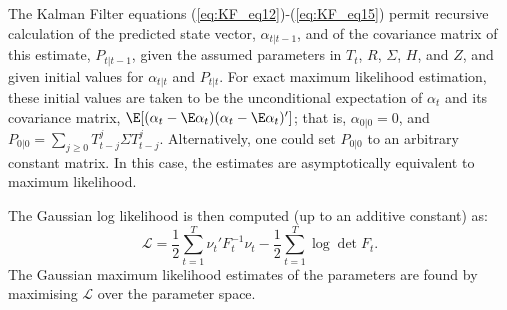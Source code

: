 The Kalman Filter equations (\ref{eq:KF_eq12})-(\ref{eq:KF_eq15}) permit recursive calculation of the predicted state vector, $\alpha_{t|t-1}$, and of the covariance matrix of this estimate, $P_{t|t-1}$, given the assumed parameters in $T_t$, $R$, $\Sigma$, $H$, and $Z$, and given initial values for $\alpha_{t|t}$ and $P_{t|t}$. For exact maximum likelihood estimation, these initial values are taken to be the unconditional expectation of $\alpha_t$ and its covariance matrix, $\E[(\alpha_t-\E\alpha_t)(\alpha_t-\E\alpha_t)']$; that is, $\alpha_{0|0}=0$, and $P_{0|0} = \sum_{j\geq 0} T_{t-j}^j \Sigma T_{t-j}^j$. Alternatively, one could set $P_{0|0}$ to an arbitrary constant matrix. In this case, the estimates are asymptotically equivalent to maximum likelihood.

The Gaussian log likelihood is then computed (up to an additive constant) as:
\begin{equation}
	\mathcal{L} = \frac{1}{2}\sum_{t=1}^T \nu_t' F_{t}^{-1}\nu_t - \frac{1}{2}\sum_{t=1}^T \log \det F_t.
\end{equation}
The Gaussian maximum likelihood estimates of the parameters are found by maximising $\mathcal{L}$ over the parameter space.